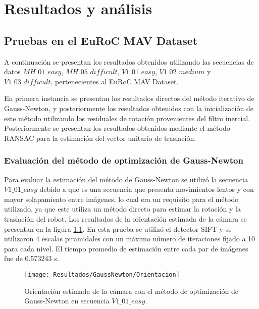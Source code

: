 \chapter{Resultados y análisis}
\label{capitulo6}

\section{Pruebas en el EuRoC MAV Dataset}
A continuación se presentan los resultados obtenidos
utilizando las secuencias de datos  $MH\_ 01\_ easy$,  $MH\_ 05\_ difficult$,  $V1\_ 01\_ easy$,
$V1\_ 02\_ medium$ y  $V1\_ 03\_ difficult$, pertenecientes al EuRoC MAV Dataset.

En primera instancia se presentan los resultados directos del método iterativo de Gauss-Newton, y posteriormente los resultados obtenidos con la inicialización de este método utilizando los residuales de rotación provenientes del filtro inercial. Posteriormente se presentan los resultados obtenidos mediante el método RANSAC para la estimación del vector unitario de traslación.


\subsection{Evaluación del método de optimización de Gauss-Newton }

Para evaluar la estimación del método de Gauss-Newton se utilizó la secuencia $V1\_ 01\_ easy$ debido a que es una secuencia que presenta movimientos lentos y con mayor solapamiento entre imágenes, lo cual era un requisito para el método utilizado, ya que este utiliza un método directo para estimar la rotación y la traslación del robot. Los resultados de la orientación estimada de la cámara se presentan en la figura \ref{imagen:Resultados/GaussNewton/Orientacion}. En esta prueba se utilizó el detector SIFT y se utilizaron 4 escalas piramidales con un máximo número de iteraciones fijado a 10 para cada nivel. El tiempo promedio de estimación entre cada par de imágenes fue de 0.573243 s.

\begin{figure}[H]
	\centering
	\texttt{[image: Resultados/GaussNewton/Orientacion]}
	\caption[Orientación estimada con el]{Orientación estimada de la cámara con el método de optimización de Gauss-Newton en secuencia $V1\_ 01\_ easy$. }
	\label{imagen:Resultados/GaussNewton/Orientacion}
\end{figure}

